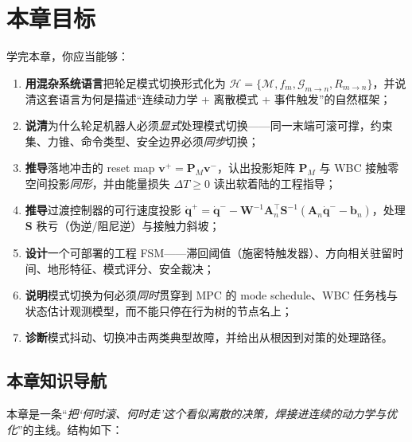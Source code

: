 \section*{本章目标}
学完本章，你应当能够：
\begin{enumerate}
  \item \textbf{用混杂系统语言}把轮足模式切换形式化为 $\mathcal H=\{\mathcal M,f_m,\mathcal G_{m\to n},R_{m\to n}\}$，并说清这套语言为何是描述“连续动力学 + 离散模式 + 事件触发”的自然框架；
  \item \textbf{说清}为什么轮足机器人必须\emph{显式}处理模式切换——同一末端可滚可撑，约束集、力锥、命令类型、安全边界必须\emph{同步}切换；
  \item \textbf{推导}落地冲击的 reset map $\mathbf v^+=\mathbf P_M\mathbf v^-$，认出投影矩阵 $\mathbf P_M$ 与 WBC 接触零空间投影\emph{同形}，并由能量损失 $\Delta T\ge0$ 读出软着陆的工程指导；
  \item \textbf{推导}过渡控制器的可行速度投影 $\dot{\mathbf q}^+=\dot{\mathbf q}^--\mathbf W^{-1}\mathbf A_n^\top\mathbf S^{-1}(\mathbf A_n\dot{\mathbf q}^--\mathbf b_n)$，处理 $\mathbf S$ 秩亏（伪逆/阻尼逆）与接触力斜坡；
  \item \textbf{设计}一个可部署的工程 FSM——滞回阈值（施密特触发器）、方向相关驻留时间、地形特征、模式评分、安全裁决；
  \item \textbf{说明}模式切换为何必须\emph{同时}贯穿到 MPC 的 mode schedule、WBC 任务栈与状态估计观测模型，而不能只停在行为树的节点名上；
  \item \textbf{诊断}模式抖动、切换冲击两类典型故障，并给出从根因到对策的处理路径。
\end{enumerate}

\subsection*{本章知识导航}
本章是一条“\emph{把‘何时滚、何时走’这个看似离散的决策，焊接进连续的动力学与优化}”的主线。结构如下：

